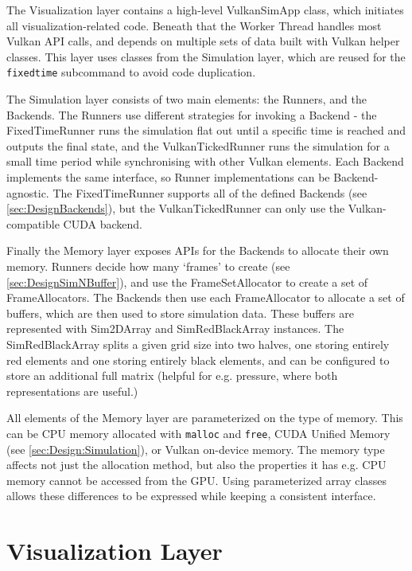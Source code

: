 The Visualization layer contains a high-level VulkanSimApp class, which initiates all visualization-related code.
Beneath that the Worker Thread handles most Vulkan API calls, and depends on multiple sets of data built with Vulkan helper classes.
This layer uses classes from the Simulation layer, which are reused for the \texttt{fixedtime} subcommand to avoid code duplication.

The Simulation layer consists of two main elements: the Runners, and the Backends.
The Runners use different strategies for invoking a Backend - the FixedTimeRunner runs the simulation flat out until a specific time is reached and outputs the final state, and the VulkanTickedRunner runs the simulation for a small time period while synchronising with other Vulkan elements.
Each Backend implements the same interface, so Runner implementations can be Backend-agnostic.
The FixedTimeRunner supports all of the defined Backends (see \cref{sec:DesignBackends}), but the VulkanTickedRunner can only use the Vulkan-compatible CUDA backend.

Finally the Memory layer exposes APIs for the Backends to allocate their own memory.
Runners decide how many `frames' to create (see \cref{sec:DesignSimNBuffer}), and use the FrameSetAllocator to create a set of FrameAllocators.
The Backends then use each FrameAllocator to allocate a set of buffers, which are then used to store simulation data.
These buffers are represented with Sim2DArray and SimRedBlackArray instances.
The SimRedBlackArray splits a given grid size into two halves, one storing entirely red elements and one storing entirely black elements, and can be configured to store an additional full matrix (helpful for e.g. pressure, where both representations are useful.)

All elements of the Memory layer are parameterized on the type of memory.
This can be CPU memory allocated with \texttt{malloc} and \texttt{free}, CUDA Unified Memory (see \cref{sec:Design:Simulation}), or Vulkan on-device memory. 
The memory type affects not just the allocation method, but also the properties it has e.g. CPU memory cannot be accessed from the GPU.
Using parameterized array classes allows these differences to be expressed while keeping a consistent interface.



\section{Visualization Layer}



